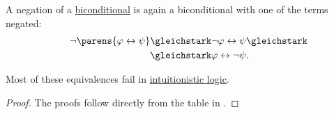\begin{proposition}
\begin{thmenum}
     A negation of a \hyperref[def:propositional_language/connectives/biconditional]{biconditional} is again a biconditional with one of the terms negated:
    \begin{equation}\label{eq:thm:boolean_equivalences/biconditional_negation}
      \begin{split}
        \mathllap{\neg \parens{\varphi \leftrightarrow \psi}}
        &\gleichstark
        \mathrlap{\neg \varphi \leftrightarrow \psi \gleichstark}
        \\ &\gleichstark
        \mathrlap{\varphi \leftrightarrow \neg \psi.}
      \end{split}
    \end{equation}
  \end{thmenum}
\end{proposition}
\begin{comments}
  \item Most of these equivalences fail in \hyperref[def:intuitionistic_propositional_deductive_systems]{intuitionistic logic}.
\end{comments}
\begin{proof}
  The proofs follow directly from the table in .
\end{proof}

